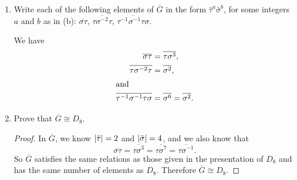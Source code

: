 \begin{enumerate}
\item Write each of the following elements of $\overline{G}$ in the
  form $\bar\tau^a\bar\sigma^b$, for some integers $a$ and $b$ as in
  (b): $\overline{\sigma\tau}$, $\overline{\tau\sigma^{-2}\tau}$,
  $\overline{\tau^{-1}\sigma^{-1}\tau\sigma}$.
  \begin{solution}
    We have
    \begin{align*}
      \overline{\sigma\tau} &= \overline{\tau\sigma^3}, \\
      \overline{\tau\sigma^{-2}\tau} &= \overline{\sigma^2}, \\
      \intertext{and}
      \overline{\tau^{-1}\sigma^{-1}\tau\sigma}
      &= \overline{\sigma^6} = \overline{\sigma^2}.
      \qedhere
    \end{align*}
  \end{solution}

\item Prove that $\overline{G}\cong D_8$.
  \begin{proof}
    In $\overline{G}$, we know $\lvert{\bar\tau}\rvert = 2$ and
    $\lvert{\bar\sigma}\rvert = 4$, and we also know that
    \begin{equation*}
      \overline{\sigma\tau} = \overline{\tau\sigma^3}
      = \overline{\tau\sigma^7} = \overline{\tau\sigma^{-1}}.
    \end{equation*}
    So $\overline{G}$ satisfies the same relations as those given in
    the presentation of $D_8$ and has the same number of elements as
    $D_8$. Therefore $\overline{G}\cong D_8$.
  \end{proof}
\end{enumerate}

